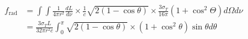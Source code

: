 \documentclass{article}
\begin{document}
\begin{equation}
    \begin{split}
    f_{\mathrm{rad}} &= \int
\int\frac{1}{4\pi r^2}\frac{dL}{d\nu}\times \frac{1}{c}\sqrt{2\left(1 - \cos \theta \right)} \times \frac{3 \sigma_T}{16\pi}(1 + \cos^2 \Theta) d\Omega d\nu\\
%
&= \frac{3 \sigma_T L}{32\pi r^2 c} \int_0^\pi \sqrt{2\left(1 - \cos \theta \right)} \times (1 + \cos^2 \theta) \sin \theta d\theta\\
    \end{split}
\end{equation}
\end{document}
